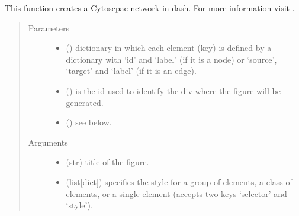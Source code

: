 \documentclass[letterpaper,10pt,english]{sphinxmanual}
\begin{document}

\begin{fulllineitems}
\label{\detokenize{_autosummary/analytics_core.viz:analytics_core.viz.viz.get_cytoscape_network}}
This function creates a Cytoscpae network in dash. For more information visit .
\begin{quote}\begin{description}
\item[{Parameters}] \leavevmode\begin{itemize}
\item {} 
 () \textendash{} dictionary in which each element (key) is defined by a dictionary with ‘id’ and ‘label’                     (if it is a node) or ‘source’, ‘target’ and ‘label’ (if it is an edge).

\item {} 
 () \textendash{} is the id used to identify the div where the figure will be generated.

\item {} 
 () \textendash{} see below.

\end{itemize}

\item[{Arguments}] \leavevmode\begin{itemize}
\item {} 
 (str) \textendash{} title of the figure.

\item {} 
 (list{[}dict{]}) \textendash{} specifies the style for a group of elements, a class of elements, or a single element                                         (accepts two keys ‘selector’ and ‘style’).


\end{itemize}
\end{description}
\end{quote}
\end{fulllineitems}
\end{document}
